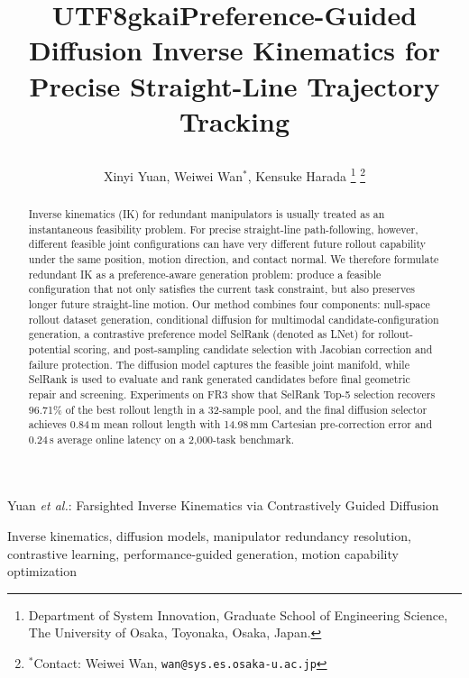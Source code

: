 \documentclass[journal, twoside]{IEEEtran}
\newcommand{\xinyi}[1]{{\color{darkorange}\begin{CJK*}{UTF8}{gkai}#1\end{CJK*}}}
\begin{document}
\title{\xinyi{Preference-Guided Diffusion Inverse Kinematics for\\ Precise Straight-Line Trajectory Tracking}}
\author{Xinyi Yuan, Weiwei Wan$^{*}$, Kensuke Harada
\thanks{Department of System Innovation, Graduate School of Engineering Science, The University of Osaka, Toyonaka, Osaka, Japan.}
\thanks{$^{*}$Contact: Weiwei Wan, {\tt\small wan@sys.es.osaka-u.ac.jp}}}
%
{Yuan \MakeLowercase{\textit{et al.}}: Farsighted Inverse Kinematics via Contrastively Guided Diffusion}
\maketitle

\begin{abstract}
Inverse kinematics (IK) for redundant manipulators is usually treated as an instantaneous feasibility problem. For precise straight-line path-following, however, different feasible joint configurations can have very different future rollout capability under the same position, motion direction, and contact normal. We therefore formulate redundant IK as a preference-aware generation problem: produce a feasible configuration that not only satisfies the current task constraint, but also preserves longer future straight-line motion. Our method combines four components: null-space rollout dataset generation, conditional diffusion for multimodal candidate-configuration generation, a contrastive preference model SelRank (denoted as LNet) for rollout-potential scoring, and post-sampling candidate selection with Jacobian correction and failure protection. The diffusion model captures the feasible joint manifold, while SelRank is used to evaluate and rank generated candidates before final geometric repair and screening. Experiments on FR3 show that SelRank Top-5 selection recovers 96.71\% of the best rollout length in a 32-sample pool, and the final diffusion selector achieves 0.84\,m mean rollout length with 14.98\,mm Cartesian pre-correction error and 0.24\,s average online latency on a 2{,}000-task benchmark.
\end{abstract}


\begin{IEEEkeywords}
Inverse kinematics, diffusion models, manipulator redundancy resolution, contrastive learning, performance-guided generation, motion capability optimization
\end{IEEEkeywords}
\end{document}
